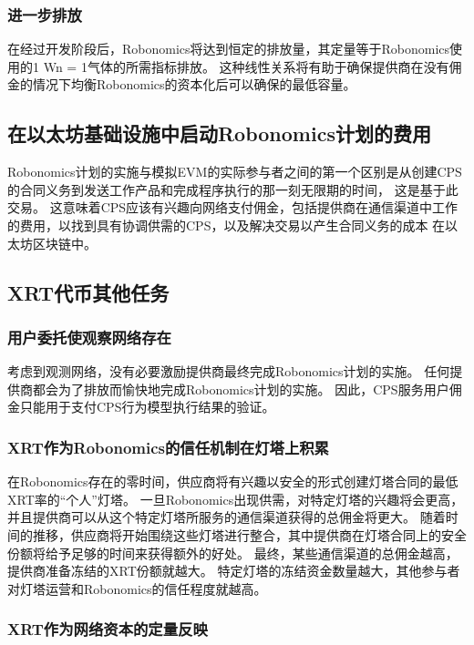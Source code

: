 \documentclass[UTF8]{article}
\begin{document}
\subsubsection{进一步排放}

在经过开发阶段后，Robonomics将达到恒定的排放量，其定量等于Robonomics使用的1 Wn = 1气体的所需指标排放。 这种线性关系将有助于确保提供商在没有佣金的情况下均衡Robonomics的资本化后可以确保的最低容量。

\subsection{在以太坊基础设施中启动Robonomics计划的费用}

Robonomics计划的实施与模拟EVM的实际参与者之间的第一个区别是从创建CPS的合同义务到发送工作产品和完成程序执行的那一刻无限期的时间， 这是基于此交易。 这意味着CPS应该有兴趣向网络支付佣金，包括提供商在通信渠道中工作的费用，以找到具有协调供需的CPS，以及解决交易以产生合同义务的成本 在以太坊区块链中。

\subsection{XRT代币其他任务}
\subsubsection{用户委托使观察网络存在}

考虑到观测网络，没有必要激励提供商最终完成Robonomics计划的实施。 任何提供商都会为了排放而愉快地完成Robonomics计划的实施。 因此，CPS服务用户佣金只能用于支付CPS行为模型执行结果的验证。

\subsubsection{XRT作为Robonomics的信任机制在灯塔上积累}

在Robonomics存在的零时间，供应商将有兴趣以安全的形式创建灯塔合同的最低XRT率的“个人”灯塔。 一旦Robonomics出现供需，对特定灯塔的兴趣将会更高，并且提供商可以从这个特定灯塔所服务的通信渠道获得的总佣金将更大。 随着时间的推移，供应商将开始围绕这些灯塔进行整合，其中提供商在灯塔合同上的安全份额将给予足够的时间来获得额外的好处。 最终，某些通信渠道的总佣金越高，提供商准备冻结的XRT份额就越大。 特定灯塔的冻结资金数量越大，其他参与者对灯塔运营和Robonomics的信任程度就越高。

\subsubsection{XRT作为网络资本的定量反映}
\end{document}
